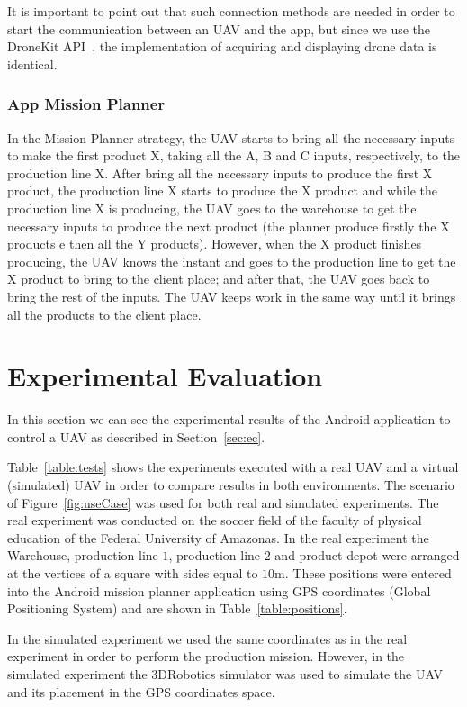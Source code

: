 \documentclass[12pt]{article}
\begin{document}
It is important to point out that such connection methods are needed in order to start the communication between an UAV and the app, but since we use the DroneKit API~\cite{dronekit}, the implementation of acquiring and displaying drone data is identical.

\subsubsection{App Mission Planner}
\label{subsubsec:mp}
In the Mission Planner strategy, the UAV starts to bring all the necessary inputs to make the first product X, taking all the A, B and C inputs, respectively, to the production line X. After bring all the necessary inputs to produce the first X product, the production line X starts to produce the X product and while the production line X is producing, the UAV goes to the warehouse to get the necessary inputs to produce the next product (the planner produce firstly the X products e then all the Y products). However, when the X product finishes producing, the UAV knows the instant and goes to the production line to get the X product to bring to the client place; and after that, the UAV goes back to bring the rest of the inputs. The UAV keeps work in the same way until it brings all the products to the client place.

\section{Experimental Evaluation}
\label{sec:results}

In this section we can see the experimental results of the Android application to control a UAV as described in Section~\ref{sec:ec}.

Table~\ref{table:tests} shows the experiments executed with a real UAV and a virtual (simulated) UAV in order to compare results in both environments.  The scenario of Figure~\ref{fig:useCase} was used for both real and simulated experiments. The real experiment was conducted on the soccer field of the faculty of physical education of the Federal University of Amazonas. In the real experiment the Warehouse, production line $1$, production line $2$ and product depot were arranged at the vertices of a square with sides equal to $10$m. These positions were entered into the Android mission planner application using GPS coordinates (Global Positioning System) and are shown in Table~\ref{table:positions}.

In the simulated experiment we used the same coordinates as in the real experiment in order to perform the production mission. However, in the simulated experiment the 3DRobotics simulator was used to simulate the UAV and its placement in the GPS coordinates space.
\end{document}
